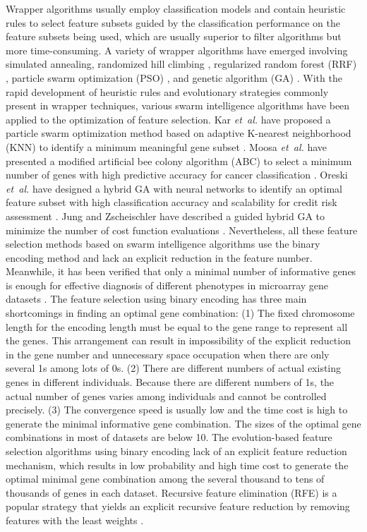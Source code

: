 \documentclass[10pt,journal,compsoc]{IEEEtran}
\begin{document}
	Wrapper algorithms usually employ classification models and contain heuristic rules to select feature subsets guided by the classification performance on the feature subsets being used, which are usually superior to filter algorithms but more time-consuming. A variety of wrapper algorithms have emerged involving simulated annealing, randomized hill climbing \cite{W26}, regularized random forest (RRF) \cite{W11}, particle swarm optimization (PSO) \cite{W12,W10}, and genetic algorithm (GA) \cite{W13}. With the rapid development of heuristic rules and evolutionary strategies commonly present in wrapper techniques, various swarm intelligence algorithms have been applied to the optimization of feature selection. Kar \emph{et~al.} have proposed a particle swarm optimization method based on adaptive K-nearest neighborhood (KNN) to identify a minimum meaningful gene subset \cite{W15}. Moosa \emph{et~al.} have presented a modified artificial bee colony algorithm (ABC) to select a minimum number of genes with high predictive accuracy for cancer classification \cite{P32}. Oreski \emph{et~al.} have designed a hybrid GA with neural networks to identify an optimal feature subset with high classification accuracy and scalability for credit risk assessment \cite{W17}. Jung and Zscheischler have described a guided hybrid GA to minimize the number of cost function evaluations \cite{W18}. Nevertheless, all these feature selection methods based on swarm intelligence algorithms use the binary encoding method and lack an explicit reduction in the feature number. Meanwhile, it has been verified that only a minimal number of informative genes is enough for effective diagnosis of different phenotypes in microarray gene datasets \cite{P1,W16,P32,P33}. The feature selection using binary encoding has three main shortcomings in finding an optimal gene combination: (1) The fixed chromosome length for the encoding length must be equal to the gene range to represent all the genes. This arrangement can result in impossibility of the explicit reduction in the gene number and unnecessary space occupation when there are only several 1s among lots of 0s. (2) There are different numbers of actual existing genes in different individuals. Because there are different numbers of 1s, the actual number of genes varies among individuals and cannot be controlled precisely. (3) The convergence speed is usually low and the time cost is high to generate the minimal informative gene combination. 
	The sizes of the optimal gene combinations in most of datasets are below 10. The evolution-based feature selection algorithms using binary encoding lack of an explicit feature reduction mechanism, which results in low probability and high time cost to generate the optimal minimal gene combination among the several thousand to tens of thousands of genes in each dataset.
	Recursive feature elimination (RFE) is a popular strategy that yields an explicit recursive feature reduction by removing features with the least weights \cite{W7,P1,P2,P27}.
	
\end{document}
